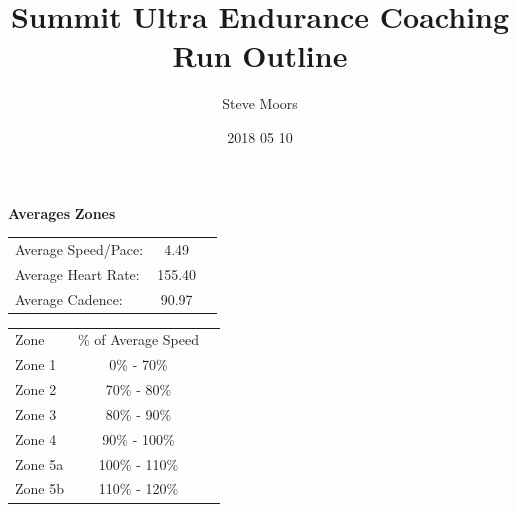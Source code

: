 \documentclass{article}
\title{Summit Ultra Endurance Coaching\\
Run Outline}
\author{Steve Moors}
\date{2018 05 10}
\begin{document}
\maketitle
\begin{center}
\textbf{Averages}
\hspace{2in}
\textbf{Zones}
\end{center}
\begin{center}
\begin{tabular}{l c c}
Average Speed/Pace: & 4.49 \\
Average Heart Rate: & 155.40 \\
Average Cadence: & 90.97
\end{tabular}
\hspace{1in}
\begin{tabular}{l c c}
Zone & \% of Average Speed \\
Zone 1 & 0\% - 70\% \\
Zone 2 & 70\% - 80\% \\
Zone 3 & 80\% - 90\% \\
Zone 4 & 90\% - 100\% \\
Zone 5a & 100\% - 110\% \\
Zone 5b & 110\% - 120\% 
\end{tabular}
\end{center}
\end{document}
